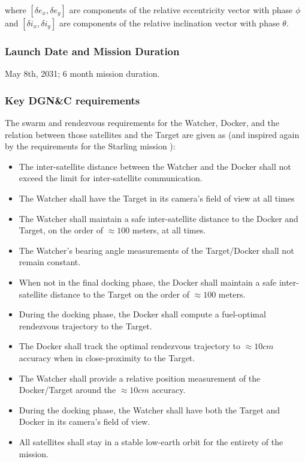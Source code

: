 where $[\delta e_x, \delta e_y]$ are components of the relative eccentricity vector with phase $\phi$ and $[\delta i_x, \delta i_y]$ are components of the relative inclination vector with phase $\theta$.    

\subsubsection{Launch Date and Mission Duration} 
May 8th, 2031; 6 month mission duration.

\subsubsection{Key DGN\&C requirements}


The swarm and rendezvous requirements for the Watcher, Docker, and the relation between those satellites and the Target are given as (and inspired again by the requirements for the Starling mission \cite{kruger2024starling}):

\begin{itemize}
    \item The inter-satellite distance between the Watcher and the Docker shall not exceed the limit for inter-satellite communication.
    \item The Watcher shall have the Target in its camera's field of view at all times 
    \item The Watcher shall maintain a safe inter-satellite distance to the Docker and Target, on the order of $\approx100$ meters, at all times.
    \item The Watcher's bearing angle measurements of the Target/Docker shall not remain constant.
    \item When not in the final docking phase, the Docker shall maintain a safe inter-satellite distance to the Target on the order of $\approx 100$ meters.
    \item During the docking phase, the Docker shall compute a fuel-optimal rendezvous trajectory to the Target.
    \item The Docker shall track the optimal rendezvous trajectory to $\approx 10 cm$ accuracy when in close-proximity to the Target.
    \item The Watcher shall provide a relative position measurement of the Docker/Target around the $\approx 10 cm$ accuracy.
    \item During the docking phase, the Watcher shall have both the Target and Docker in its camera's field of view.
    \item All satellites shall stay in a stable low-earth orbit for the entirety of the mission.
\end{itemize}


